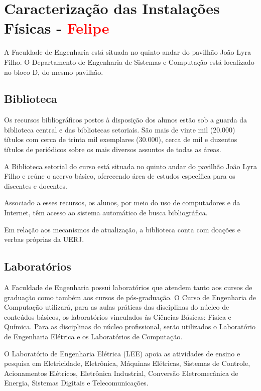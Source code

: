 \chapter{Caracterização das Instalações Físicas - \textcolor{red}{Felipe}}

A Faculdade de Engenharia está situada no quinto andar do pavilhão João Lyra Filho. O Departamento de Engenharia de Sistemas e Computação está localizado no bloco D, do mesmo pavilhão.

\section{Biblioteca}
Os recursos bibliográficos postos à disposição dos alunos estão sob a guarda da biblioteca central e das bibliotecas setoriais. São mais de vinte mil (20.000) títulos com cerca de trinta mil exemplares (30.000), cerca de mil e duzentos títulos de periódicos sobre os mais diversos assuntos de todas as áreas.

A Biblioteca setorial do curso está situada no quinto andar do pavilhão João Lyra Filho e reúne o acervo básico, oferecendo área de estudos específica para os discentes e docentes.

Associado a esses recursos, os alunos, por meio do uso de computadores e da Internet, têm acesso ao sistema automático de busca bibliográfica.

Em relação aos mecanismos de atualização, a biblioteca conta com doações e verbas próprias da UERJ.

\section{Laboratórios}

A Faculdade de Engenharia possui laboratórios que atendem tanto aos cursos de graduação como também aos cursos de pós-graduação. O Curso de Engenharia de Computação utilizará, para as aulas práticas das disciplinas do núcleo de conteúdos básicos, os laboratórios vinculados às Ciências Básicas: Física e Química. Para as disciplinas do núcleo profissional, serão utilizados o Laboratório de Engenharia Elétrica e os Laboratórios de Computação.

O Laboratório de Engenharia Elétrica (LEE) apoia as atividades de ensino e pesquisa em Eletricidade, Eletrônica, Máquinas Elétricas, Sistemas de Controle, Acionamentos Elétricos, Eletrônica Industrial, Conversão Eletromecânica de Energia, Sistemas Digitais e Telecomunicações.

